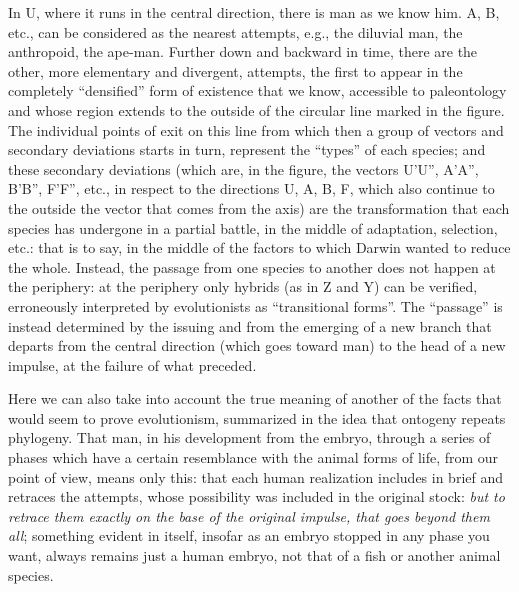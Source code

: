In U, where it runs in the central direction, there is man as we know him. A, B, etc., can be considered as the nearest attempts, e.g., the diluvial man, the anthropoid, the ape-man. Further down and backward in time, there are the other, more elementary and divergent, attempts, the first to appear in the completely ``densified'' form of existence that we know, accessible to paleontology and whose region extends to the outside of the circular line marked in the figure. The individual points of exit on this line from which then a group of vectors and secondary deviations starts in turn, represent the ``types'' of each species; and these secondary deviations (which are, in the figure, the vectors U'U'', A'A'', B'B'', F'F'', etc., in respect to the directions U, A, B, F, which also continue to the outside the vector that comes from the axis) are the transformation that each species has undergone in a partial battle, in the middle of adaptation, selection, etc.: that is to say, in the middle of the factors to which Darwin wanted to reduce the whole. Instead, the passage from one species to another does not happen at the periphery: at the periphery only hybrids (as in Z and Y) can be verified, erroneously interpreted by evolutionists as ``transitional forms''. The ``passage'' is instead determined by the issuing and from the emerging of a new branch that departs from the central direction (which goes toward man) to the head of a new impulse, at the failure of what preceded.

Here we can also take into account the true meaning of another of the facts that would seem to prove evolutionism, summarized in the idea that ontogeny repeats phylogeny. That man, in his development from the embryo, through a series of phases which have a certain resemblance with the animal forms of life, from our point of view, means only this: that each human realization includes in brief and retraces the attempts, whose possibility was included in the original stock: \emph{but to retrace them exactly on the base of the original impulse, that goes beyond them all}; something evident in itself, insofar as an embryo stopped in any phase you want, always remains just a human embryo, not that of a fish or another animal species.

